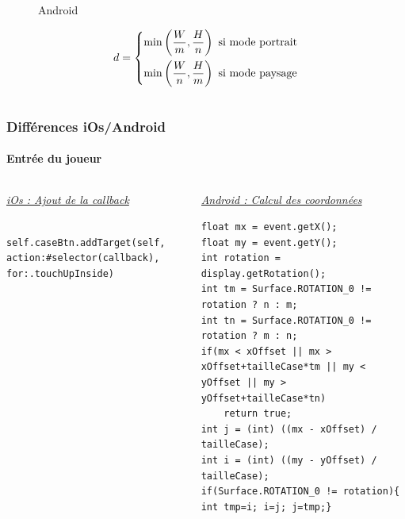 \documentclass{beamer}
\newcommand{\Min}[1]{\min\limits_{#1}}
\begin{document}
\begin{frame}
\begin{columns}
\begin{column}{0.4\linewidth}
\begin{figure}[H]
                \caption{Android}
            \end{figure}
            \tiny
            $$d=\begin{dcases}
\Min{}\left(\frac{W}{m}, \frac{H}{n}\right) \text{ si mode portrait} \\
\Min{}\left(\frac{W}{n}, \frac{H}{m}\right) \text{ si mode paysage}
\end{dcases}$$
    \end{column}
    \end{columns}

\end{frame}

\begin{frame}[fragile]
  \frametitle{Différences iOs/Android}
    \framesubtitle{Entrée du joueur}
    
    \begin{columns}
    \begin{column}{0.5\linewidth}
    \noindent \underline{\textit{iOs : Ajout de la callback}}\\
    \begin{verbatim}
    self.caseBtn.addTarget(self, action:#selector(callback), for:.touchUpInside)
    \end{verbatim}
    \end{column}
    
    \begin{column}{0.5\linewidth}
    \noindent \underline{\textit{Android : Calcul des coordonnées}}\\
    \tiny
    \begin{verbatim}
float mx = event.getX();
float my = event.getY();
int rotation = display.getRotation();
int tm = Surface.ROTATION_0 != rotation ? n : m;
int tn = Surface.ROTATION_0 != rotation ? m : n;
if(mx < xOffset || mx > xOffset+tailleCase*tm || my < yOffset || my > yOffset+tailleCase*tn)
    return true;
int j = (int) ((mx - xOffset) / tailleCase);
int i = (int) ((my - yOffset) / tailleCase);
if(Surface.ROTATION_0 != rotation){ int tmp=i; i=j; j=tmp;}
    \end{verbatim}
    \end{column}
    \end{columns}
\end{frame}
\end{document}

